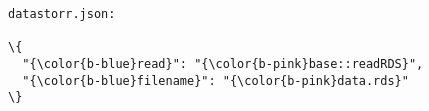 \documentclass[class=minimal,border=0]{standalone}
\begin{document}
%
\begin{BVerbatim}[bgcolor=b-darkgrey]
datastorr.json:

\{
  "{\color{b-blue}read}": "{\color{b-pink}base::readRDS}",
  "{\color{b-blue}filename}": "{\color{b-pink}data.rds}"
\}
\end{BVerbatim}
\end{document}
